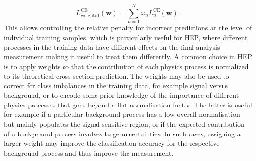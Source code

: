 \begin{equation}
    L_{\text{weighted}}^{\text{CE}}(\pmb{w}) = \sum _{n=1}^{N} \omega_n L_n^{\text{CE}}(\pmb{w}).
\end{equation}
This allows controlling the relative penalty for incorrect predictions at the level of individual training samples, which is particularly useful for HEP, where different processes in the training data have different effects on the final analysis measurement making it useful to treat them differently.
A common choice in HEP is to apply weights so that the contribution of each physics process is normalized to its theoretical cross-section prediction.
The weights may also be used to correct for class imbalances in the training data, for example signal versus background, or to encode some prior knowledge of the importance of different physics processes that goes beyond a flat normalisation factor. The latter is useful for example if a particular background process has a low overall normalisation but mainly populates the signal sensitive region, or if the expected contribution of a background process involves large uncertainties.
In such cases, assigning a larger weight may improve the classification accuracy for the respective background process and thus improve the measurement.

